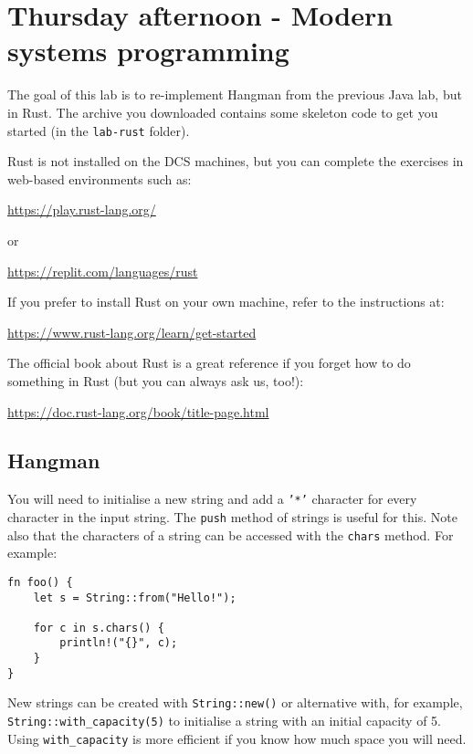 \section{Thursday afternoon - Modern systems programming}

The goal of this lab is to re-implement Hangman from the previous Java lab, but in Rust. The archive you downloaded contains some skeleton code to get you started (in the \texttt{\small lab-rust} folder). 

Rust is not installed on the DCS machines, but you can complete the exercises in web-based environments such as: 
\begin{center}
    \url{https://play.rust-lang.org/}
\end{center}
or
\begin{center}
    \url{https://replit.com/languages/rust}
\end{center}
If you prefer to install Rust on your own machine, refer to the instructions at: 
\begin{center}
    \url{https://www.rust-lang.org/learn/get-started}
\end{center}

The official book about Rust is a great reference if you forget how to do something in Rust (but you can always ask us, too!):
\begin{center}
    \url{https://doc.rust-lang.org/book/title-page.html}
\end{center}

\subsection*{Hangman}


You will need to initialise a new string and add a \texttt{\small '*'} character for every character in the input string. The \texttt{\small push} method of strings is useful for this. Note also that the characters of a string can be accessed with the \texttt{\small chars} method. For example:
\begin{verbatim}
fn foo() {
    let s = String::from("Hello!");

    for c in s.chars() {
        println!("{}", c);
    }
}
\end{verbatim}
New strings can be created with \texttt{String::new()} or alternative with, for example, \texttt{String::with_capacity(5)} to initialise a string with an initial capacity of 5. Using \texttt{with_capacity} is more efficient if you know how much space you will need.

